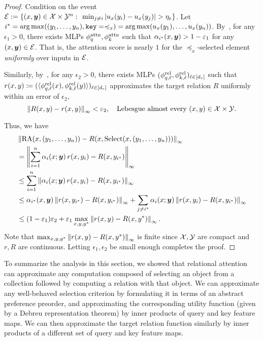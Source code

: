 \begin{proof}
  Condition on the event ${\mathcal{E}} := \{(x, \bm{y}) \in {\mathcal{X}} \times {\mathcal{Y}}^n \,\colon\, \min_{j \neq i} \left\lvert u_x(y_i) - u_x(y_j)\right\rvert > \eta_\varepsilon\}$. Let $i^* = \operatorname*{arg\,max}((y_1, \ldots, y_n), \mathtt{key} = \preccurlyeq_x) = \operatorname*{arg\,max}(u_x(y_1), \ldots, u_x(y_n))$. By~\citep[Theorem 5.1]{altabaaApproximationRelationFunctions2024}, for any $\epsilon_1 > 0$, there exists MLPs $\phi_q^{\mathrm{attn}}, \phi_k^{\mathrm{attn}}$ such that $\alpha_{i^*}(x, \bm{y}) > 1 - \varepsilon_1$ for any $(x, \bm{y}) \in {\mathcal{E}}$. That is, the attention score is nearly $1$ for the $\preceq_x$-selected element \textit{uniformly} over inputs in ${\mathcal{E}}$.

  Similarly, by~\citep[Theorem 3.1]{altabaaApproximationRelationFunctions2024}, for any $\epsilon_2 > 0$, there exists MLPs $(\phi_{q, \ell}^{\mathrm{rel}}, \phi_{k, \ell}^{\mathrm{rel}})_{\ell \in [d_r]}$ such that $r(x, y) \coloneq (\langle \phi_{q, \ell}^{\mathrm{rel}}(x), \phi_{k, \ell}^{\mathrm{rel}}(y) \rangle)_{\ell \in [d_r]}$ approximates the target relation $R$ uniformly within an error of $\epsilon_2$,
  \begin{equation*}
    \left\lVert R(x, y) - r(x, y)\right\rVert_{\infty} < \varepsilon_2, \quad \text{Lebesgue almost every } (x, y) \in {\mathcal{X}} \times {\mathcal{Y}}.
  \end{equation*}

  Thus, we have
  \begin{align*}
    &\left\lVert\mathrm{RA}(x, (y_1, \ldots, y_n)) - R(x, \mathrm{Select}(x, (y_1, \ldots, y_n)))\right\rVert_{\infty} \\
    &= \left\lVert\sum_{i=1}^{n} \alpha_i(x; \bm{y}) \,r(x, y_i) - R(x, y_{i^*})\right\rVert_{\infty} \\
    &\leq \sum_{i=1}^{n} \left\lVert\alpha_i(x; \bm{y}) \,r(x, y_i) - R(x, y_{i^*})\right\rVert_{\infty} \\
    &\leq \alpha_{i^*}(x, \bm{y}) \left\lVert r(x, y_{i^*}) - R(x, y_{i^*})\right\rVert_{\infty} + \sum_{j \neq i^*} \alpha_i(x; \bm{y}) \left\lVert r(x, y_i) - R(x, y_{i^*})\right\rVert_{\infty}\\
    &\leq (1 - \varepsilon_1) \varepsilon_2 + \varepsilon_1 \max_{x, y, y^*} \left\lVert r(x, y) - R(x, y^{*})\right\rVert_{\infty}.
  \end{align*}
  Note that $\max_{x, y, y^*} \left\lVert r(x, y) - R(x, y^*)\right\rVert_{\infty}$ is finite since ${\mathcal{X}}, {\mathcal{Y}}$ are compact and $r, R$ are continuous. Letting $\epsilon_1, \epsilon_2$ be small enough completes the proof.
\end{proof}

To summarize the analysis in this section, we showed that relational attention can approximate any computation composed of selecting an object from a collection followed by computing a relation with that object. We can approximate any well-behaved selection criterion by formulating it in terms of an abstract preference preorder, and approximating the corresponding utility function (given by a Debreu representation theorem) by inner products of query and key feature maps. We can then approximate the target relation function similarly by inner products of a different set of query and key feature maps.

